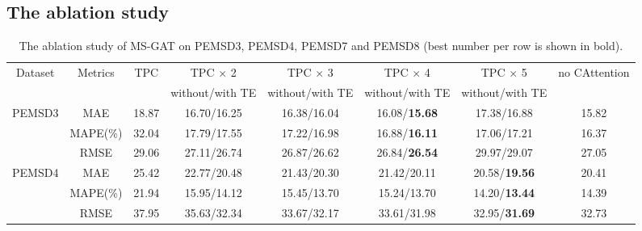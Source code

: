 \subsection{The ablation study}
\begin{table}[!htb]
    \caption{The ablation study of MS-GAT on PEMSD3, PEMSD4, PEMSD7 and PEMSD8 (best number per row is shown in bold).}
    \label{tab:ablation}
    \centering
    \begin{tabular}{cccccccc}
        \toprule[2pt]
        \multirow{4}{*}{Dataset}                     &
        \multirow{4}{*}{Metrics}                     &
        \multirow{4}{*}{TPC}                         &
        \multirow{2}{*}{TPC $\times$ 2}              &
        \multirow{2}{*}{TPC $\times$ 3}              &
        \multirow{2}{*}{TPC $\times$ 4}              &
        \multirow{2}{*}{TPC $\times$ 5}              &
        \multirow{4}{*}{no CAttention}               
        \\
        \\
        \cline{4-7}
        & & &
        \multirow{2}{*}{without/with TE}             &
        \multirow{2}{*}{without/with TE}             &
        \multirow{2}{*}{without/with TE}             &
        \multirow{2}{*}{without/with TE}             &
        \\
        \\
        \hline
        \multicolumn{1}{c|}{\multirow{3}{*}{PEMSD3}} & \multicolumn{1}{c|}{MAE}      & 18.87 & 16.70/16.25 & 16.38/16.04 & 16.08/\textbf{15.68} & 17.38/16.88          & 15.82 \\
        \multicolumn{1}{c|}{}                        & \multicolumn{1}{c|}{MAPE(\%)} & 32.04 & 17.79/17.55 & 17.22/16.98 & 16.88/\textbf{16.11} & 17.06/17.21          & 16.37 \\
        \multicolumn{1}{c|}{}                        & \multicolumn{1}{c|}{RMSE}     & 29.06 & 27.11/26.74 & 26.87/26.62 & 26.84/\textbf{26.54} & 29.97/29.07          & 27.05 \\
        \hline
        \multicolumn{1}{c|}{\multirow{3}{*}{PEMSD4}} & \multicolumn{1}{c|}{MAE}      & 25.42 & 22.77/20.48 & 21.43/20.30 & 21.42/20.11          & 20.58/\textbf{19.56} & 20.41 \\
        \multicolumn{1}{c|}{}                        & \multicolumn{1}{c|}{MAPE(\%)} & 21.94 & 15.95/14.12 & 15.45/13.70 & 15.24/13.70          & 14.20/\textbf{13.44} & 14.39 \\
        \multicolumn{1}{c|}{}                        & \multicolumn{1}{c|}{RMSE}     & 37.95 & 35.63/32.34 & 33.67/32.17 & 33.61/31.98          & 32.95/\textbf{31.69} & 32.73 \\

\end{tabular}
\end{table}
